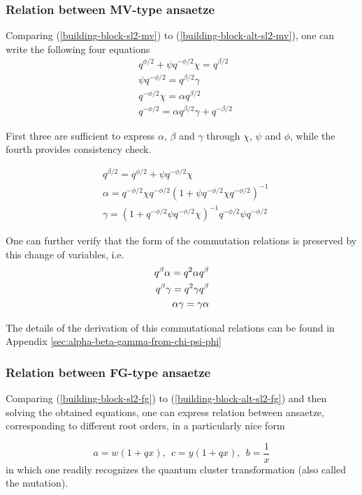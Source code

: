 \documentclass{article}
\newcommand{\lb}{\left (}
\newcommand{\rb}{\right )}
\newcommand{\be}{\begin{eqnarray}}
\newcommand{\ee}{\end{eqnarray}}
\newcommand {\?}{\textit{???}}
\newcommand{\delabel}[1]{(\ref{#1})}
\begin{document}
\subsubsection{Relation between MV-type ansaetze}
Comparing \delabel{building-block-sl2-mv} to \delabel{building-block-alt-sl2-mv}, one can write
the following four equations
\be
\label{albega-pcp-equations}
& q^{\phi/2} + \psi q^{-\phi/2} \chi = q^{\beta/2} \\
& \psi q^{-\phi/2} = q^{\beta/2} \gamma \nonumber \\
& q^{-\phi/2} \chi = \alpha q^{\beta/2} \nonumber \\
& q^{-\phi/2} = \alpha q^{\beta/2} \gamma + q^{-\beta/2} \nonumber
\ee

First three are sufficient to express $\alpha$, $\beta$ and $\gamma$ through $\chi$, $\psi$ and $\phi$,
while the fourth provides consistency check.

\be
& q^{\beta/2} = q^{\phi/2} + \psi q^{-\phi/2} \chi \nonumber \\
\label{albega-through-pcp}
& \alpha = q^{-\phi/2} \chi q^{-\phi/2} \lb 1 + \psi q^{-\phi/2} \chi q^{-\phi/2} \rb^{-1} \\
& \gamma = \lb 1 + q^{-\phi/2} \psi q^{-\phi/2} \chi \rb^{-1} q^{-\phi/2} \psi q^{-\phi/2} \nonumber
\ee

One can further verify that the form of the commutation relations is preserved by this change of variables, i.e.
\begin{align}
q^{\beta} \alpha = q^2 \alpha q^{\beta} \\ \notag
q^{\beta} \gamma = q^2 \gamma q^{\beta} \\ \notag
\alpha \gamma = \gamma \alpha
\end{align}

The details of the derivation of this commutational relations
can be found in Appendix \ref{sec:alpha-beta-gamma-from-chi-psi-phi}

\subsubsection{Relation between FG-type ansaetze}
Comparing \delabel{building-block-sl2-fg} to \delabel{building-block-alt-sl2-fg} and then
solving the obtained equations, one can express relation between
ansaetze, corresponding to different root orders, in a particularly nice form

\begin{equation}
\label{quantum-mutation-sl2}
  \boxed{
    a = w (1 + q x),\ \ c = y(1 + q x), \ \ b = \frac{1}{x}
  }
\end{equation}
in which one readily recognizes the quantum cluster transformation (also called the mutation).
\end{document}
